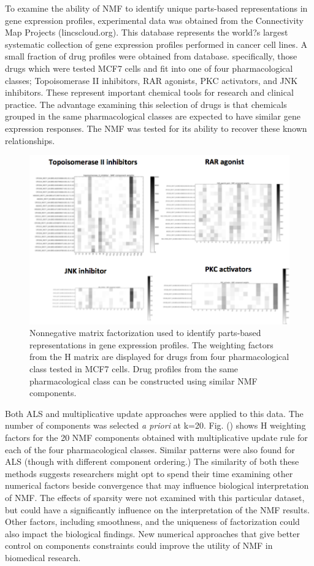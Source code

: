 \documentclass[final,leqno,onefignum,onetabnum]{siamltex1213}
\begin{document}
To examine the ability of NMF to identify unique parts-based representations in gene expression profiles, experimental data was obtained from the Connectivity Map Projects (lincscloud.org). This database represents the world?s largest systematic collection of gene expression profiles performed in cancer cell lines. A small fraction of drug profiles were obtained from database. specifically, those drugs which were tested MCF7 cells and fit into one of four pharmacological classes; Topoisomerase II inhibitors, RAR agonists, PKC activators, and JNK inhibitors. These represent important chemical tools for research and clinical practice. The advantage examining this selection of drugs is that chemicals grouped in the same pharmacological classes are expected to have similar gene expression responses. The NMF was tested for its ability to recover these known relationships. 

\begin{figure}[t!]
  \centering
    \includegraphics[width=.5\linewidth]{NMF_pharmacological_classification}
  \caption{Nonnegative matrix factorization used to identify parts-based representations in gene expression profiles. The weighting factors from the H matrix are displayed for drugs from four pharmacological class tested in MCF7 cells. Drug profiles from the same pharmacological class can be constructed using similar NMF components.}
\end{figure}

Both ALS and multiplicative update approaches were applied to this data. The number of components was selected \textit{a priori} at k=20. Fig. () shows H weighting factors for the 20 NMF components obtained with multiplicative update rule for each of the four pharmacological classes. Similar patterns were also found for ALS (though with different component ordering.) The similarity of both these methods suggests researchers might opt to spend their time examining other numerical factors beside convergence that may influence biological interpretation of NMF. The effects of sparsity were not examined with this particular dataset, but could have a significantly influence on the interpretation of the NMF results. Other factors, including smoothness, and the uniqueness of factorization could also impact the biological findings. New numerical approaches that give better control on components constraints could improve the utility of NMF in biomedical research. 
\end{document}
